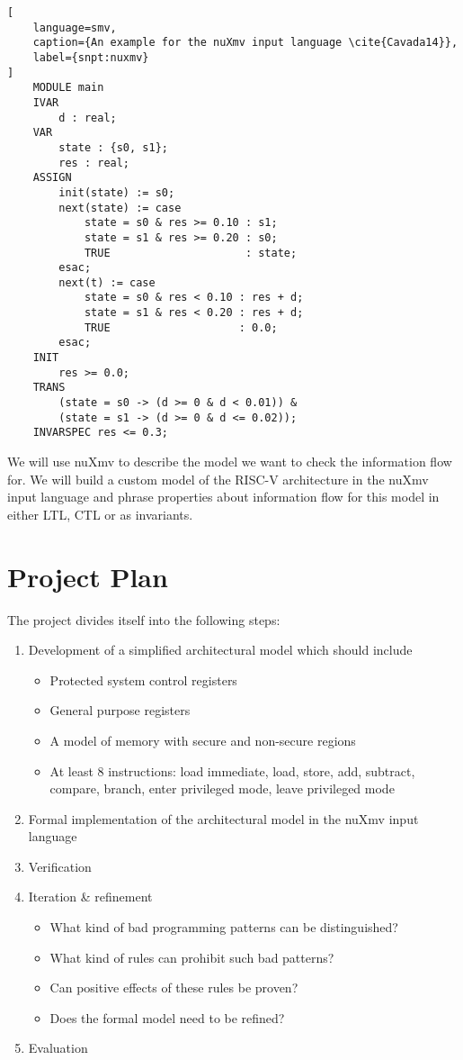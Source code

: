 \documentclass{article}
\begin{document}
\begin{lstlisting}[
    language=smv,
    caption={An example for the nuXmv input language \cite{Cavada14}},
    label={snpt:nuxmv}
]
    MODULE main
    IVAR
        d : real;
    VAR
        state : {s0, s1};
        res : real;
    ASSIGN
        init(state) := s0;
        next(state) := case
            state = s0 & res >= 0.10 : s1;
            state = s1 & res >= 0.20 : s0;
            TRUE                     : state;
        esac;
        next(t) := case
            state = s0 & res < 0.10 : res + d;
            state = s1 & res < 0.20 : res + d;
            TRUE                    : 0.0;
        esac;
    INIT
        res >= 0.0;
    TRANS
        (state = s0 -> (d >= 0 & d < 0.01)) &
        (state = s1 -> (d >= 0 & d <= 0.02));
    INVARSPEC res <= 0.3;
\end{lstlisting}

We will use nuXmv to describe the model we want to check the information flow for.
We will build a custom model of the RISC-V architecture in the nuXmv input language and phrase properties about information flow for this model in either LTL, CTL or as invariants.

\section{Project Plan}

The project divides itself into the following steps:
\begin{enumerate}
    \item Development of a simplified architectural model which should include
    \begin{itemize}
        \item Protected system control registers
        \item General purpose registers
        \item A model of memory with secure and non-secure regions
        \item At least 8 instructions: load immediate, load, store, add, subtract, compare, branch, enter privileged mode, leave privileged mode
    \end{itemize}
    \item Formal implementation of the architectural model in the nuXmv input language
    \item Verification
    \item Iteration \& refinement
    \begin{itemize}
        \item What kind of bad programming patterns can be distinguished?
        \item What kind of rules can prohibit such bad patterns?
        \item Can positive effects of these rules be proven?
        \item Does the formal model need to be refined?
    \end{itemize}
    \item Evaluation
\end{enumerate}



\end{document}

